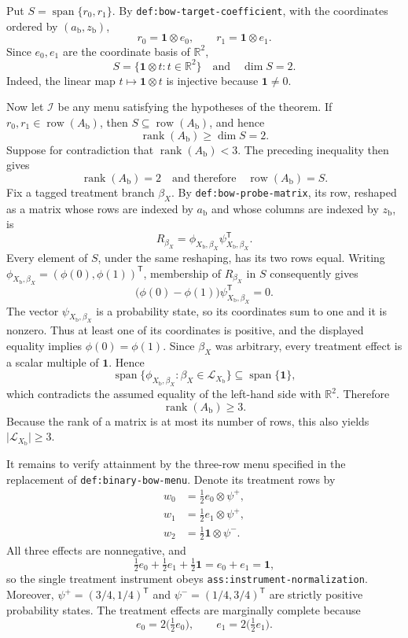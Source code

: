 Put \(S=\operatorname{span}\{r_0,r_1\}\).  By
\texttt{def:bow-target-coefficient}, with the coordinates ordered by
\((a_{\mathrm b},z_{\mathrm b})\),
\[
 r_0=\mathbf 1\otimes e_0,
 \qquad
 r_1=\mathbf 1\otimes e_1.
\]
Since \(e_0,e_1\) are the coordinate basis of \(\mathbb R^2\),
\[
 S=\{\mathbf 1\otimes t:t\in\mathbb R^2\}
 \quad\text{and}\quad
 \dim S=2.
\]
Indeed, the linear map \(t\mapsto\mathbf 1\otimes t\) is injective because
\(\mathbf 1\ne0\).

Now let \(\mathcal I\) be any menu satisfying the hypotheses of the theorem.
If \(r_0,r_1\in\operatorname{row}(A_{\mathrm b})\), then
\(S\subseteq\operatorname{row}(A_{\mathrm b})\), and hence
\[
 \operatorname{rank}(A_{\mathrm b})\geq\dim S=2.
\]
Suppose for contradiction that \(\operatorname{rank}(A_{\mathrm b})<3\).
The preceding inequality then gives
\[
 \operatorname{rank}(A_{\mathrm b})=2
 \quad\text{and therefore}\quad
 \operatorname{row}(A_{\mathrm b})=S.
\]
Fix a tagged treatment branch \(\beta_X\).  By
\texttt{def:bow-probe-matrix}, its row, reshaped as a matrix whose rows are
indexed by \(a_{\mathrm b}\) and whose columns are indexed by
\(z_{\mathrm b}\), is
\[
 R_{\beta_X}
 =\phi_{X_{\mathrm b},\beta_X}
   \psi_{X_{\mathrm b},\beta_X}^{\mathsf T}.
\]
Every element of \(S\), under the same reshaping, has its two rows equal.
Writing
\(\phi_{X_{\mathrm b},\beta_X}=(\phi(0),\phi(1))^{\mathsf T}\), membership
of \(R_{\beta_X}\) in \(S\) consequently gives
\[
 \bigl(\phi(0)-\phi(1)\bigr)
 \psi_{X_{\mathrm b},\beta_X}^{\mathsf T}=0.
\]
The vector \(\psi_{X_{\mathrm b},\beta_X}\) is a probability state, so its
coordinates sum to one and it is nonzero.  Thus at least one of its
coordinates is positive, and the displayed equality implies
\(\phi(0)=\phi(1)\).  Since \(\beta_X\) was arbitrary, every treatment
effect is a scalar multiple of \(\mathbf 1\).  Hence
\[
 \operatorname{span}\{\phi_{X_{\mathrm b},\beta_X}:
       \beta_X\in\mathcal L_{X_{\mathrm b}}\}
 \subseteq\operatorname{span}\{\mathbf 1\},
\]
which contradicts the assumed equality of the left-hand side with
\(\mathbb R^2\).  Therefore
\[
 \operatorname{rank}(A_{\mathrm b})\geq3.
\]
Because the rank of a matrix is at most its number of rows, this also yields
\(\lvert\mathcal L_{X_{\mathrm b}}\rvert\geq3\).

It remains to verify attainment by the three-row menu specified in the
replacement of \texttt{def:binary-bow-menu}.  Denote its treatment rows by
\[
 \begin{aligned}
 w_0&=\tfrac12 e_0\otimes\psi^{+},\\
 w_1&=\tfrac12 e_1\otimes\psi^{+},\\
 w_2&=\tfrac12\mathbf 1\otimes\psi^{-}.
 \end{aligned}
\]
All three effects are nonnegative, and
\[
 \tfrac12e_0+\tfrac12e_1+\tfrac12\mathbf 1
 =e_0+e_1=\mathbf 1,
\]
so the single treatment instrument obeys
\texttt{ass:instrument-normalization}.  Moreover,
\(\psi^{+}=(3/4,1/4)^{\mathsf T}\) and
\(\psi^{-}=(1/4,3/4)^{\mathsf T}\) are strictly positive probability
states.  The treatment effects are marginally complete because
\[
 e_0=2\bigl(\tfrac12e_0\bigr),
 \qquad
 e_1=2\bigl(\tfrac12e_1\bigr).
\]

